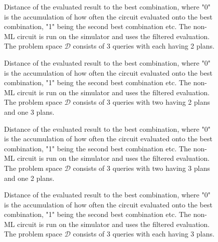 \begin{figure}[!h]
    \centering
    \scalebox{\resultboxplot}{
        
    }
    \caption{Distance of the evaluated result to the best combination, where "0" is the accumulation of how often the circuit evaluated onto the best combination, "1" being the second best combination etc. The non-ML circuit is run on the simulator and uses the filtered evaluation. The problem space $\mathcal{D}$ consists of 3 queries with each having 2 plans.}
    \label{figure:bars_dist_2_2_2}
\end{figure}

\begin{figure}[!h]
    \centering
    \scalebox{\resultboxplot}{
        
    }
    \caption{Distance of the evaluated result to the best combination, where "0" is the accumulation of how often the circuit evaluated onto the best combination, "1" being the second best combination etc. The non-ML circuit is run on the simulator and uses the filtered evaluation. The problem space $\mathcal{D}$ consists of 3 queries with two having 2 plans and one 3 plans.}
    \label{figure:bars_dist_2_3_2}
\end{figure}

\begin{figure}[!h]
    \centering
    \scalebox{\resultboxplot}{
        
    }
    \caption{Distance of the evaluated result to the best combination, where "0" is the accumulation of how often the circuit evaluated onto the best combination, "1" being the second best combination etc. The non-ML circuit is run on the simulator and uses the filtered evaluation. The problem space $\mathcal{D}$ consists of 3 queries with two having 3 plans and one 2 plans.}
    \label{figure:bars_dist_3_2_3}
\end{figure}

\begin{figure}[!h]
    \centering
    \scalebox{\resultboxplot}{
        
    }
    \caption{Distance of the evaluated result to the best combination, where "0" is the accumulation of how often the circuit evaluated onto the best combination, "1" being the second best combination etc. The non-ML circuit is run on the simulator and uses the filtered evaluation. The problem space $\mathcal{D}$ consists of 3 queries with each having 3 plans.}
    \label{figure:bars_dist_3_3_3}
\end{figure}

